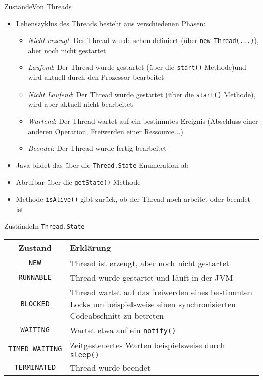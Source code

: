 \begin{frame}{Zustände}{Von Threads}
    \begin{itemize}
        \item Lebenszyklus des Threads besteht aus verschiedenen Phasen:
        \begin{itemize}
            \item \textit{Nicht erzeugt}: Der Thread wurde schon definiert (über \texttt{new Thread(...)}), aber noch nicht gestartet
            \item \textit{Laufend}: Der Thread wurde gestartet (über die \texttt{start()} Methode)und wird aktuell durch den Prozessor bearbeitet
            \item \textit{Nicht Laufend}: Der Thread wurde gestartet (über die \texttt{start()} Methode), wird aber aktuell nicht bearbeitet
            \item \textit{Wartend}: Der Thread wartet auf ein bestimmtes Ereignis (Abschluss einer anderen Operation, Freiwerden einer Ressource...)
            \item \textit{Beendet}: Der Thread wurde fertig bearbeitet
        \end{itemize}
        \item Java bildet das über die \texttt{Thread.State} Enumeration ab
        \item Abrufbar über die \texttt{getState()} Methode
        \item Methode \texttt{isAlive()} gibt zurück, ob der Thread noch arbeitet oder beendet ist
    \end{itemize}
\end{frame}

\begin{frame}{Zustände}{In \texttt{Thread.State}}
    \begin{tabular}{|c|p{9cm}|}
    \hline
    \textbf{Zustand}&\textbf{Erklärung}\\
    \hline
    \hline
    \texttt{NEW} & Thread ist erzeugt, aber noch nicht gestartet\\\hline
    \texttt{RUNNABLE} & Thread wurde gestartet und läuft in der JVM\\\hline
    \texttt{BLOCKED} & Thread wartet auf das freiwerden eines bestimmten Locks um beispielsweise einen synchronisierten Codeabschnitt zu betreten\\\hline
    \texttt{WAITING} & Wartet etwa auf ein \texttt{notify()}\\\hline
    \texttt{TIMED\_WAITING} & Zeitgesteuertes Warten beispielsweise durch \texttt{sleep()}\\\hline
    \texttt{TERMINATED} & Thread wurde beendet\\\hline
    \end{tabular}
\end{frame}
